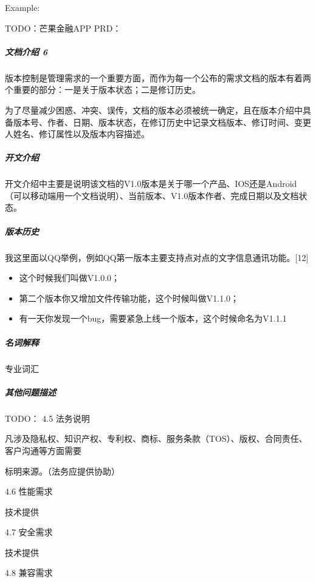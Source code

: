 \documentclass[letterpaper,10pt,english]{sphinxmanual}
\begin{document}
Example: 

TODO：芒果金融APP PRD：


\subparagraph{文档介绍 6\sphinxfootnotemark[568]}
\label{\detokenize{chapter_knowledge/PRD:id14}}%
\begin{footnotetext}[568]\sphinxAtStartFootnote
{}
%
\end{footnotetext}\ignorespaces 
版本控制是管理需求的一个重要方面，而作为每一个公布的需求文档的版本有着两个重要的部分：一是关于版本状态；二是修订历史。

为了尽量减少困惑、冲突、误传，文档的版本必须被统一确定，且在版本介绍中具备版本号、作者、日期、版本状态，在修订历史中记录文档版本、修订时间、变更人姓名、修订属性以及版本内容描述。


\subparagraph{开文介绍}
\label{\detokenize{chapter_knowledge/PRD:id15}}
开文介绍中主要是说明该文档的V1.0版本是关于哪一个产品、IOS还是Android（可以移动端用一个文档说明）、当前版本、V1.0版本作者、完成日期以及文档状态。


\subparagraph{版本历史}
\label{\detokenize{chapter_knowledge/PRD:id16}}
我这里面以QQ举例，例如QQ第一版本主要支持点对点的文字信息通讯功能。{[}12{]}
\begin{itemize}
\item {} 
这个时候我们叫做V1.0.0；

\item {} 
​第二个版本你又增加文件传输功能，这个时候叫做V1.1.0；

\item {} 
​有一天你发现一个bug，需要紧急上线一个版本，这个时候命名为V1.1.1

\end{itemize}


\subparagraph{名词解释}
\label{\detokenize{chapter_knowledge/PRD:id17}}
专业词汇


\subparagraph{其他问题描述}
\label{\detokenize{chapter_knowledge/PRD:id18}}
TODO： 4.5 法务说明

凡涉及隐私权、知识产权、专利权、商标、服务条款（TOS）、版权、合同责任、客户沟通等方面需要

标明来源。（法务应提供协助）

4.6 性能需求

技术提供

4.7 安全需求

技术提供

4.8 兼容需求
\end{document}
